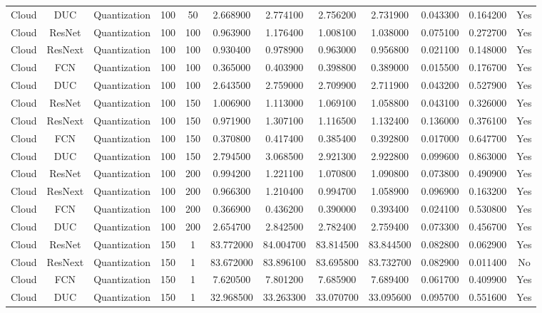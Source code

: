\begin{tabular}{|c||c||c||c||c||c||c||c||c||c||c||c|}
Cloud & DUC & Quantization & 100 & 50 & 2.668900 & 2.774100 & 2.756200 & 2.731900 & 0.043300 & 0.164200 & Yes \\
Cloud & ResNet & Quantization & 100 & 100 & 0.963900 & 1.176400 & 1.008100 & 1.038000 & 0.075100 & 0.272700 & Yes \\
Cloud & ResNext & Quantization & 100 & 100 & 0.930400 & 0.978900 & 0.963000 & 0.956800 & 0.021100 & 0.148000 & Yes \\
Cloud & FCN & Quantization & 100 & 100 & 0.365000 & 0.403900 & 0.398800 & 0.389000 & 0.015500 & 0.176700 & Yes \\
Cloud & DUC & Quantization & 100 & 100 & 2.643500 & 2.759000 & 2.709900 & 2.711900 & 0.043200 & 0.527900 & Yes \\
Cloud & ResNet & Quantization & 100 & 150 & 1.006900 & 1.113000 & 1.069100 & 1.058800 & 0.043100 & 0.326000 & Yes \\
Cloud & ResNext & Quantization & 100 & 150 & 0.971900 & 1.307100 & 1.116500 & 1.132400 & 0.136000 & 0.376100 & Yes \\
Cloud & FCN & Quantization & 100 & 150 & 0.370800 & 0.417400 & 0.385400 & 0.392800 & 0.017000 & 0.647700 & Yes \\
Cloud & DUC & Quantization & 100 & 150 & 2.794500 & 3.068500 & 2.921300 & 2.922800 & 0.099600 & 0.863000 & Yes \\
Cloud & ResNet & Quantization & 100 & 200 & 0.994200 & 1.221100 & 1.070800 & 1.090800 & 0.073800 & 0.490900 & Yes \\
Cloud & ResNext & Quantization & 100 & 200 & 0.966300 & 1.210400 & 0.994700 & 1.058900 & 0.096900 & 0.163200 & Yes \\
Cloud & FCN & Quantization & 100 & 200 & 0.366900 & 0.436200 & 0.390000 & 0.393400 & 0.024100 & 0.530800 & Yes \\
Cloud & DUC & Quantization & 100 & 200 & 2.654700 & 2.842500 & 2.782400 & 2.759400 & 0.073300 & 0.456700 & Yes \\
Cloud & ResNet & Quantization & 150 & 1 & 83.772000 & 84.004700 & 83.814500 & 83.844500 & 0.082800 & 0.062900 & Yes \\
Cloud & ResNext & Quantization & 150 & 1 & 83.672000 & 83.896100 & 83.695800 & 83.732700 & 0.082900 & 0.011400 & No \\
Cloud & FCN & Quantization & 150 & 1 & 7.620500 & 7.801200 & 7.685900 & 7.689400 & 0.061700 & 0.409900 & Yes \\
Cloud & DUC & Quantization & 150 & 1 & 32.968500 & 33.263300 & 33.070700 & 33.095600 & 0.095700 & 0.551600 & Yes \\

\end{tabular}
